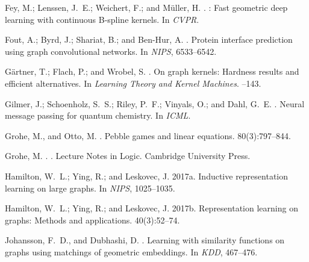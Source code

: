 \documentclass[letterpaper]{article}
\theoremstyle{definition}
\begin{document}
\begin{thebibliography}{}
	Fey, M.; Lenssen, J.~E.; Weichert, F.; and M{\"u}ller, H.
	.
	: Fast geometric deep learning with continuous {B}-spline
	kernels.
	\newblock In {\em CVPR}.
	
	Fout, A.; Byrd, J.; Shariat, B.; and Ben-Hur, A.
	.
	\newblock Protein interface prediction using graph convolutional networks.
	\newblock In {\em NIPS},  6533--6542.
	
	G\"{a}rtner, T.; Flach, P.; and Wrobel, S.
	.
	\newblock On graph kernels: Hardness results and efficient alternatives.
	\newblock In {\em Learning Theory and Kernel Machines}.
	--143.
	
	Gilmer, J.; Schoenholz, S.~S.; Riley, P.~F.; Vinyals, O.; and Dahl, G.~E.
	.
	\newblock Neural message passing for quantum chemistry.
	\newblock In {\em ICML}.
	
	Grohe, M., and Otto, M.
	.
	\newblock Pebble games and linear equations.
	 80(3):797--844.
	
	Grohe, M.
	.
	.
	\newblock Lecture Notes in Logic. Cambridge University Press.
	
	Hamilton, W.~L.; Ying, R.; and Leskovec, J.
	\newblock 2017a.
	\newblock Inductive representation learning on large graphs.
	\newblock In {\em NIPS},  1025--1035.
	
	Hamilton, W.~L.; Ying, R.; and Leskovec, J.
	\newblock 2017b.
	\newblock Representation learning on graphs: Methods and applications.
	 40(3):52--74.
	
	Johansson, F.~D., and Dubhashi, D.
	.
	\newblock Learning with similarity functions on graphs using matchings of
	geometric embeddings.
	\newblock In {\em KDD},  467--476.
	

\end{thebibliography}
\end{document}

